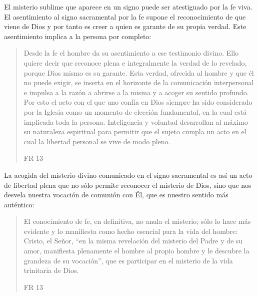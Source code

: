 El misterio sublime que aparece en un signo puede ser atestiguado por la fe viva. El asentimiento al signo sacramental por la fe supone el reconocimiento de que viene de Dios y por tanto es creer a quien es garante de su propia verdad. Este asentimiento implica a la persona por completo: \blockquote[FR 13]{Desde la fe el hombre da su asentimiento a ese testimonio divino. Ello quiere decir que reconoce plena e integralmente la verdad de lo revelado, porque Dios mismo es su garante. Esta verdad, ofrecida al hombre y que él no puede exigir, se inserta en el horizonte de la comunicación interpersonal e impulsa a la razón a abrirse a la misma y a acoger su sentido profundo. Por esto el acto con el que uno confía en Dios siempre ha sido considerado por la Iglesia como un momento de elección fundamental, en la cual está implicada toda la persona. Inteligencia y voluntad desarrollan al máximo su naturaleza espiritual para permitir que el sujeto cumpla un acto en el cual la libertad personal se vive de modo pleno.} La acogida del misterio divino comunicado en el signo sacramental es así un acto de libertad plena que no sólo permite reconocer el misterio de Dios, sino que nos desvela nuestra vocación de comunión con Él, que es nuestro sentido más auténtico: \blockquote[FR 13]{El conocimiento de fe, en definitiva, no anula el misterio; sólo lo hace más evidente y lo manifiesta como hecho esencial para la vida del hombre: Cristo, el Señor, \enquote{en la misma revelación del misterio del Padre y de su amor, manifiesta plenamente el hombre al propio hombre y le descubre la grandeza de su vocación}, que es participar en el misterio de la vida trinitaria de Dios.}

